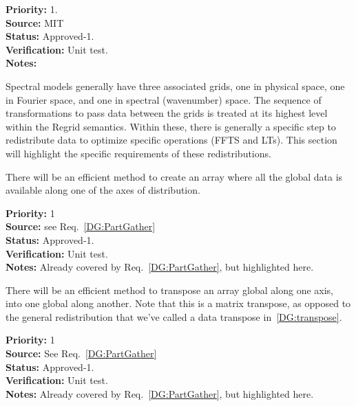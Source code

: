 \begin{reqlist}
{\bf Priority:} 1. \\ 
{\bf Source:} MIT \\
{\bf Status:} Approved-1. \\
{\bf Verification:} Unit test. \\
{\bf Notes:}
\end{reqlist}


Spectral models generally have three associated grids, one in physical
space, one in Fourier space, and one in spectral (wavenumber) space.
The sequence of transformations to pass data between the grids is
treated at its highest level within the Regrid semantics. Within
these, there is generally a specific step to redistribute data to
optimize specific operations (FFTS and LTs). This section will
highlight the specific requirements of these redistributions.


There will be an efficient method to create an array where all the
global data is available along one of the axes of distribution.

\begin{reqlist}
{\bf Priority:} 1 \\
{\bf Source:} see Req.~\ref{DG:PartGather}\\
{\bf Status:} Approved-1. \\
{\bf Verification:} Unit test. \\
{\bf Notes:} Already covered by Req.~\ref{DG:PartGather}, but
  highlighted here.
\end{reqlist}


There will be an efficient method to transpose an array global along
one axis, into one global along another. Note that this is a matrix
transpose, as opposed to the general redistribution that we've called
a data transpose in~\ref{DG:transpose}.

\begin{reqlist}
{\bf Priority:} 1 \\
{\bf Source:} See Req.~\ref{DG:PartGather}\\
{\bf Status:} Approved-1. \\
{\bf Verification:} Unit test. \\
{\bf Notes:} Already covered by Req.~\ref{DG:PartGather}, but
  highlighted here.
\end{reqlist}

